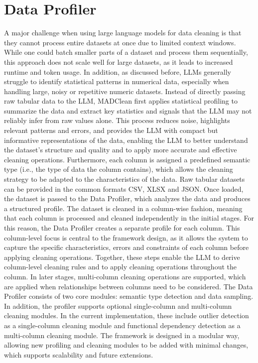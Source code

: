 \section{Data Profiler}
A major challenge when using large language models for data cleaning is that they cannot process entire datasets at once due to limited context windows. 
While one could batch smaller parts of a dataset and process them sequentially, this approach does not scale well for large datasets, as it leads to increased runtime and token usage. 
In addition, as discussed before, LLMs generally struggle to identify statistical patterns in numerical data, especially when handling large, noisy or repetitive numeric datasets.
\newline\newline
Instead of directly passing raw tabular data to the LLM, MADClean first applies statistical profiling to summarize the data and extract key statistics and signals that the LLM may not reliably infer from raw values alone. 
This process reduces noise, highlights relevant patterns and errors, and provides the LLM with compact but informative representations of the data, enabling the LLM to better understand the dataset's structure and quality and to apply more accurate and effective cleaning operations.
Furthermore, each column is assigned a predefined semantic type (i.e., the type of data the column contains), which allows the cleaning strategy to be adapted to the characteristics of the data.
\newline\newline
Raw tabular datasets can be provided in the common formats CSV, XLSX and JSON. 
Once loaded, the dataset is passed to the Data Profiler, which analyzes the data and produces a structured profile. 
The dataset is cleaned in a column-wise fashion, meaning that each column is processed and cleaned independently in the initial stages. 
For this reason, the Data Profiler creates a separate profile for each column. 
This column-level focus is central to the framework design, as it allows the system to capture the specific characteristics, errors and constraints of each column before applying cleaning operations.
Together, these steps enable the LLM to derive column-level cleaning rules and to apply cleaning operations throughout the column.
In later stages, multi-column cleaning operations are supported, which are applied when relationships between columns need to be considered.
\newline\newline
The Data Profiler consists of two core modules: semantic type detection and data sampling. 
In addition, the profiler supports optional single-column and multi-column cleaning modules. 
In the current implementation, these include outlier detection as a single-column cleaning module and functional dependency detection as a multi-column cleaning module.
The framework is designed in a modular way, allowing new profiling and cleaning modules to be added with minimal changes, which supports scalability and future extensions.

